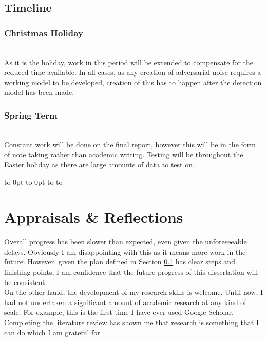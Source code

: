 \documentclass{article}
\begin{document}
\newpage
\thispagestyle{empty}
\def\fillandplacepagenumber{
 \par\pagestyle{empty}
 \vbox to 0pt{\vss}\vfill
 \vbox to 0pt{\baselineskip0pt
   \hbox to\linewidth{\hss}
   \baselineskip\footskip
   \hbox to\linewidth{
     \hfil\thepage\hfil}\vss}}
\begin{landscape}
\subsection{Timeline} \label{sec:timeline}
\subsubsection{Christmas Holiday}
\\
\noindent As it is the holiday, work in this period will be extended to compensate for the reduced time available. In all cases, as any creation of adversarial noise requires a working model to be developed, creation of this has to happen after the detection model has been made.
\subsubsection{Spring Term}
\resizebox{1.5\textwidth}{!}{}\\
Constant work will be done on the final report, however this will be in the form of note taking rather than academic writing. Testing will be throughout the Easter holiday as there are large amounts of data to test on.
\fillandplacepagenumber
\end{landscape}

\section{Appraisals \& Reflections}

Overall progress has been slower than expected, even given the unforeseeable delays. Obviously I am disappointing with this as it means more work in the future. However, given the plan defined in Section \ref{sec:timeline} has clear steps and finishing points, I am confidence that the future progress of this dissertation will be consistent.\\

On the other hand, the development of my research skills is welcome. Until now, I had not undertaken a significant amount of academic research at any kind of scale. For example, this is the first time I have ever used Google Scholar. Completing the literature review has shown me that research is something that I can do which I am grateful for.
\end{document}
